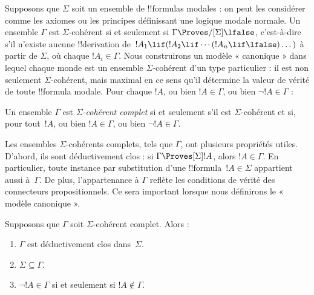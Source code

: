 \documentclass[../../../include/open-logic-section]{subfiles}
\begin{document}


Supposons que $\Sigma$ soit un ensemble de !!{formula}s modales : on
peut les considérer comme les axiomes ou les principes définissant une
logique modale normale. Un ensemble $\Gamma$ est $\Sigma$-cohérent si
et seulement si $\Gamma \Proves/[\Sigma] \lfalse$, c'est-à-dire s'il
n'existe aucune !!{derivation} de~$!A_1 \lif (!A_2 \lif \cdots (!A_n \lif
\lfalse)\dots)$ à partir de $\Sigma$, où chaque $!A_i \in \Gamma$.
Nous construirons un modèle « canonique » dans lequel chaque monde est
un ensemble $\Sigma$-cohérent d'un type particulier : il est non
seulement $\Sigma$-cohérent, mais maximal en ce sens qu'il détermine la
valeur de vérité de toute !!{formula} modale. Pour chaque $!A$, ou bien
$!A \in \Gamma$, ou bien $\lnot !A \in \Gamma$ :

\begin{defn}
  Un ensemble $\Gamma$ est \emph{$\Sigma$-cohérent complet} si et
  seulement s'il est $\Sigma$-cohérent et si, pour tout~$!A$, ou bien
  $!A \in \Gamma$, ou bien $\lnot !A \in \Gamma$.
\end{defn}

Les ensembles $\Sigma$-cohérents complets, tels que $\Gamma$, ont plusieurs
propriétés utiles. D'abord, ils sont déductivement clos : si $\Gamma
\Proves[\Sigma] !A$, alors $!A \in \Gamma$. En particulier, toute
instance par substitution d'une !!{formula}~$!A \in \Sigma$ appartient aussi à~$\Gamma$. De plus,
l'appartenance à $\Gamma$ reflète les conditions de vérité des
connecteurs propositionnels. Ce sera important lorsque nous définirons
le « modèle canonique ».

\begin{prop}
  Supposons que $\Gamma$ soit $\Sigma$-cohérent complet. Alors :
  \begin{enumerate}
  \item {}%
    $\Gamma$ est déductivement clos dans~$\Sigma$.
  \item {}%
    $\Sigma \subseteq \Gamma$.
  \item {}%
    $\lnot!A \in \Gamma$ si et seulement si $!A \notin
    \Gamma$.
  \end{enumerate}
\end{prop}
\end{document}
